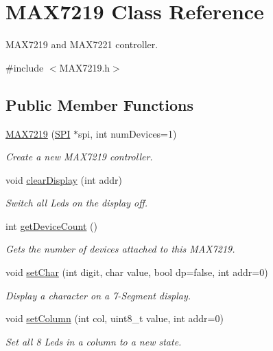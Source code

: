 \hypertarget{class_m_a_x7219}{}\section{M\+A\+X7219 Class Reference}
\label{class_m_a_x7219}


M\+A\+X7219 and M\+A\+X7221 controller.  




{\ttfamily \#include $<$M\+A\+X7219.\+h$>$}

\subsection*{Public Member Functions}
\begin{DoxyCompactItemize}
\item 
\hyperlink{class_m_a_x7219_ad7a658d65e610e3e35fff96279bd5abe}{M\+A\+X7219} (\hyperlink{class_s_p_i}{S\+PI} $\ast$spi, int num\+Devices=1)
\begin{DoxyCompactList}\small\item\em Create a new M\+A\+X7219 controller. \end{DoxyCompactList}\item 
void \hyperlink{class_m_a_x7219_ae21eeb2689755ebbd05b1df56e5bcca0}{clear\+Display} (int addr)
\begin{DoxyCompactList}\small\item\em Switch all Leds on the display off. \end{DoxyCompactList}\item 
int \hyperlink{class_m_a_x7219_a2765aed08c5ea70f43937c8b88d8b71a}{get\+Device\+Count} ()
\begin{DoxyCompactList}\small\item\em Gets the number of devices attached to this M\+A\+X7219. \end{DoxyCompactList}\item 
void \hyperlink{class_m_a_x7219_a8a4624d45533a9de52585202f7b2fc78}{set\+Char} (int digit, char value, bool dp=false, int addr=0)
\begin{DoxyCompactList}\small\item\em Display a character on a 7-\/\+Segment display. \end{DoxyCompactList}\item 
void \hyperlink{class_m_a_x7219_a4cc8fe7ad21942e059ac4a931fce502e}{set\+Column} (int col, uint8\+\_\+t value, int addr=0)
\begin{DoxyCompactList}\small\item\em Set all 8 Led\textquotesingle{}s in a column to a new state. \end{DoxyCompactList}\item 

\end{DoxyCompactItemize}
